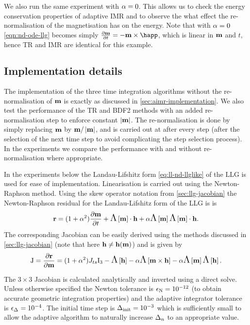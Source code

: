 We also run the same experiment with $\alpha = 0$.
This allows us to check the energy conservation properties of adaptive IMR and to observe the what effect the re-normalisation of the magnetisation has on the energy.
Note that with $\alpha = 0$ \cref{eqn:nd-ode-llg} becomes simply $\dmdt = - \mv \times \happ$, which is linear in $\boldsymbol{\mathrm{m}}$ and $t$, hence TR and IMR are identical for this example.



\subsection{Implementation details}

The implementation of the three time integration algorithms without the re-normalisation of $\boldsymbol{\mathrm{m}}$ is exactly as discussed in \cref{sec:aimr-implementation}.
We also test the performance of the TR and BDF2 methods with an added re-normalisation step to enforce constant $\left|{\boldsymbol{\mathrm{m}}} \right|$.
The re-normalisation is done by simply replacing $\boldsymbol{\mathrm{m}}$ by $\boldsymbol{\mathrm{m}}/\left|{\boldsymbol{\mathrm{m}}} \right|$, and is carried out at after every step (after the selection of the next time step to avoid complicating the step selection process).
In the experiments we compare the performance with and without re-normalisation where appropriate.

In the experiments below the Landau-Lifshitz form \cref{eq:ll-nd-llglike} of the LLG is used for ease of implementation.
Linearisation is carried out using the Newton-Raphson method.
Using the skew operator notation from \cref{sec:llg-jacobian} the Newton-Raphson residual for the Landau-Lifshitz form of the LLG is is
\begin{equation}
  \boldsymbol{\mathrm{r}} = (1 + \alpha^2) \frac{\partial \boldsymbol{\mathrm{m}}}{\partial t} + \text{\Large{$\Lambda$}}\left[ \boldsymbol{\mathrm{m}} \right] \cdot \boldsymbol{\mathrm{h}} + \alpha \text{\Large{$\Lambda$}}\left[ \boldsymbol{\mathrm{m}} \right]\text{\Large{$\Lambda$}}\left[ \boldsymbol{\mathrm{m}} \right] \cdot \boldsymbol{\mathrm{h}}.
\end{equation}
The corresponding Jacobian can be easily derived using the methods discussed in \cref{sec:llg-jacobian} (note that here $\boldsymbol{\mathrm{h}} \neq \boldsymbol{\mathrm{h}}(\boldsymbol{\mathrm{m}})$) and is given by
\begin{equation}
  \mathrm{J} = \frac{\partial \boldsymbol{\mathrm{r}}}{\partial \boldsymbol{\mathrm{m}}} = (1 + \alpha^2) J_{ts} \mathrm{I}_3 - \text{\Large{$\Lambda$}}\left[ \boldsymbol{\mathrm{h}} \right] - \alpha \text{\Large{$\Lambda$}}\left[  \boldsymbol{\mathrm{m}} \times \boldsymbol{\mathrm{h}}  \right]
  - \alpha \text{\Large{$\Lambda$}}\left[ \boldsymbol{\mathrm{m}} \right] \text{\Large{$\Lambda$}}\left[ \boldsymbol{\mathrm{h}} \right].
\end{equation}

The $3 \times 3$ Jacobian is calculated analytically and inverted using a direct solve.
Unless otherwise specified the Newton tolerance is $\epsilon_{\mathrm{N}} = 10^{-12}$ (to obtain accurate geometric integration properties) and the adaptive integrator tolerance is $\epsilon_{\Delta_{}} = 10^{-4}$.
The initial time step is $\Delta_{\mathrm{init}} = 10^{-3}$ which is sufficiently small to allow the adaptive algorithm to naturally increase $\Delta_{n}$ to an appropriate value.


